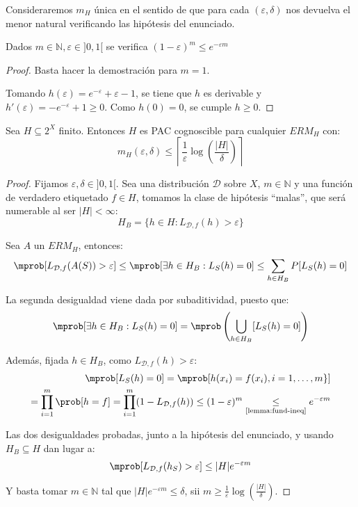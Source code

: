 Consideraremos $m_{H}$ única en el sentido de que para cada $(\varepsilon, \delta)$ nos devuelva el menor natural
verificando las hipótesis del enunciado.

\begin{lemma}
 Dados $m\in \mathbb{N}, \varepsilon\in ]0,1[$ se verifica $(1-\varepsilon)^m \le e^{-\varepsilon m}$
 \label{lemma:fund-ineq}
\end{lemma}
\begin{proof}
 Basta hacer la demostración para $m=1$.
 
 Tomando $h(\varepsilon) = e^{-\varepsilon} + \varepsilon - 1$, se tiene que $h$ es derivable y 
 $h'(\varepsilon) = -e^{-\varepsilon} + 1 \ge 0$. Como $h(0) = 0$, se cumple $h \ge 0$.
\end{proof}

\begin{theorem}
Sea $H \subseteq 2^{X}$ finito. Entonces $H$ es PAC cognoscible para cualquier $ERM_H$ con:
\[
  m_H(\varepsilon, \delta) \le \left\lceil \frac{1}{\varepsilon} \log\left(\frac{|H|}{\delta} \right) \right\rceil
\]
\label{th:finitas-pac}
\end{theorem}
  \begin{proof}
   Fijamos $\varepsilon, \delta \in ]0,1[$. Sea una distribución $\mathcal{D}$ sobre $X$, $m\in \mathbb{N}$ y una función de verdadero 
   etiquetado $f\in H$, tomamos la clase de hipótesis ``malas'', que será numerable al ser $|H| < \infty$:
   \[
     H_B = \{h\in H: L_{\mathcal{D},f}(h) > \varepsilon\}
   \]

   Sea $A$ un $ERM_{H}$, entonces:
   \[
     \mprob [L_{\mathcal{D},f}(A(S)) > \varepsilon] \le \mprob 
     [\exists h\in H_B : L_S(h) = 0] \le \sum_{h\in H_B} P [L_S(h) = 0] 
   \]

   La segunda desigualdad viene dada por subaditividad, puesto que:
   \[
     \mprob [\exists h\in H_B : L_S(h) = 0] = \mprob \left(\underset{h\in H_B}{\bigcup} [L_S(h) = 0]\right)
   \]

   Además, fijada $h\in H_B$, como $L_{\mathcal{D},f}(h) > \varepsilon$:
   \begin{align*}
   \mprob[L_S(h) = 0] = \mprob[h(x_i) = f(x_i), i =1,\ldots, m\}]\\
   = \prod_{i=1}^m \prob[h = f] = \prod_{i=1}^m (1 - L_{\mathcal{D},f}(h)) \le (1-\varepsilon)^m 
   \underset{\textrm{\ref{lemma:fund-ineq}}}{\le} e^{-\varepsilon m}
   \end{align*}

   Las dos desigualdades probadas, junto a la hipótesis del enunciado, y usando $H_B \subseteq H$ dan lugar a:
   \[
     \mprob[L_{\mathcal{D},f}(h_S) > \varepsilon] \le |H|e^{-\varepsilon m}
   \]
   
   Y basta tomar $m\in \mathbb{N}$ tal que $|H|e^{-\varepsilon m} \le \delta$, sii 
   $m\ge \frac{1}{\varepsilon} \log\left(\frac{|H|}{\delta}\right)$.
  \end{proof}

